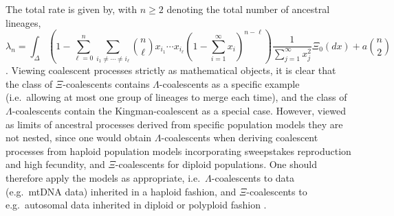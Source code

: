 \documentclass{article}
\newcommand{\be}{\begin{equation}}
\newcommand{\ee}{\end{equation}}
\begin{document}
The total rate is given by, with 
$n\ge 2$ denoting the total  number of ancestral lineages,  
\be
  \label{Xilambdab}
  \lambda_{n} = \int_\Delta \left(1 - \sum_{\ell = 0}^n \sum_{i_1 \neq
  \cdots \neq i_\ell } \binom{n}{\ell} x_{i_1}\cdots x_{i_\ell}\left(1
  - \sum_{i=1}^\infty x_i\right)^{n-\ell} \right)
  \frac{1}{\sum_{j=1}^\infty x_j^2}\Xi_0(dx) + a\binom{n}{2} \ee
  \citep{S00}.  Viewing coalescent processes strictly as mathematical
  objects, it is clear that the class of $\Xi$-coalescents contains
  $\Lambda$-coalescents as a specific example (i.e.\ allowing at most
  one group of lineages to merge each time), and the class of
  $\Lambda$-coalescents contain the Kingman-coalescent as a special
  case.  However, viewed as limits of ancestral processes derived from
  specific population models they are not nested, since one would
  obtain $\Lambda$-coalescents when deriving coalescent processes from
  haploid population models incorporating sweepstakes reproduction and
  high fecundity, and $\Xi$-coalescents for diploid populations.  One
  should therefore apply the models as appropriate, i.e.\
  $\Lambda$-coalescents to data (e.g.\ mtDNA data) inherited in a
  haploid fashion, and $\Xi$-coalescents to e.g.\ autosomal data
  inherited in diploid or polyploid fashion \citep{Blath2016}.  
\end{document}

